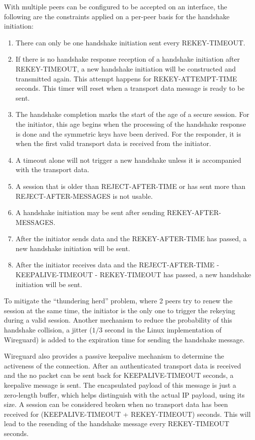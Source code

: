   With multiple peers can be configured to be accepted on an interface, the following are the constraints
  applied on a per-peer basis for the handshake initiation:
  \begin{enumerate}
    \item There can only be one handshake initiation sent every \uppercase{REKEY-TIMEOUT}.
    \item If there is no handshake response reception of a handshake initiation after \uppercase{rekey-timeout},
    a new handshake initiation will be constructed and transmitted again. This attempt happens
    for \uppercase{REKEY-attempt-time} seconds. This timer will reset when a transport data
    message is ready to be sent.
    \item The handshake completion marks the start of the age of a secure session. For the initiator,
    this age begins when the processing of the handshake response is done and the symmetric keys have
    been derived. For the responder, it is when the first valid transport data is received from
    the initiator.
    \item A timeout alone will not trigger a new handshake unless it is accompanied with the transport data.
    \item A session that is older than \uppercase{reject-after-time} or has sent more than \uppercase{REJECT-AFTER-MESSAGES}
    is not usable.
    \item A handshake initiation may be sent after sending \uppercase{Rekey-after-messages}.
    \item After the initiator sends data and the \uppercase{Rekey-after-time} has passed, 
    a new handshake initiation will be sent.
    \item After the initiator receives data and the \uppercase{Reject-after-time} - \uppercase{keepalive-timeout} 
    - \uppercase{rekey-timeout} has passed, a new handshake initiation will be sent.
  \end{enumerate}
    To mitigate the ``thundering herd'' problem, where 2 peers try to renew the session at the same time, 
    the initiator is the only one to trigger the rekeying during a valid session. Another mechanism to
    reduce the probability of this handshake collision, a jitter ($1/3$ second in the Linux implementation of Wireguard) 
    is added to the expiration time for sending the handshake  message.

    Wireguard also provides a passive keepalive mechanism to determine the activeness of the connection.
    After an authenticated transport data is received and the no packet can be sent back for \uppercase{keepalive-timeout} seconds,
    a keepalive message is sent. The encapsulated payload of this message is just a zero-length buffer,
    which helps distinguish with the actual IP payload, using its size. A session can be considered broken
    when no transport data has been received for (\uppercase{keepalive-timeout} + \uppercase{rekey-timeout}) seconds.
    This will lead to the resending of the handshake  message every \uppercase{REKEY-TIMEOUT} seconds.

